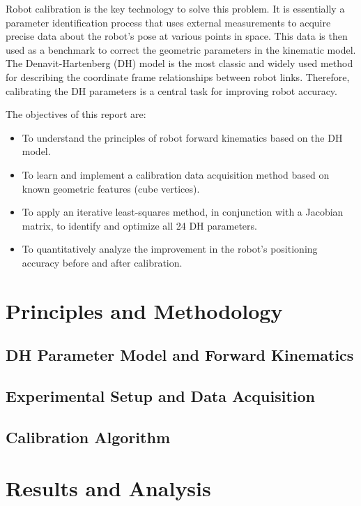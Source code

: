 \documentclass[conference]{IEEEtran}
\begin{document}
Robot calibration is the key technology to solve this problem. It is essentially a parameter identification process that uses external measurements to acquire precise data about the robot's pose at various points in space. This data is then used as a benchmark to correct the geometric parameters in the kinematic model. The Denavit-Hartenberg (DH) model is the most classic and widely used method for describing the coordinate frame relationships between robot links. Therefore, calibrating the DH parameters is a central task for improving robot accuracy.

The objectives of this report are:
\begin{itemize}
    \item To understand the principles of robot forward kinematics based on the DH model.
    \item To learn and implement a calibration data acquisition method based on known geometric features (cube vertices).
    \item To apply an iterative least-squares method, in conjunction with a Jacobian matrix, to identify and optimize all 24 DH parameters.
    \item To quantitatively analyze the improvement in the robot's positioning accuracy before and after calibration.
\end{itemize}

\section{Principles and Methodology}

\subsection{DH Parameter Model and Forward Kinematics}


\subsection{Experimental Setup and Data Acquisition}

\subsection{Calibration Algorithm}



\section{Results and Analysis}
\end{document}
